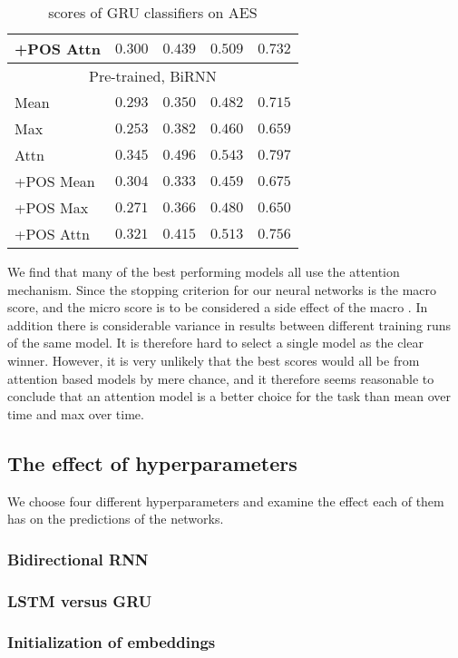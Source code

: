 \begin{table}
\begin{tabular}{lrrrr}
    +POS Attn & $0.300$ & $0.439$ & $0.509$ & $0.732$ \\
    \midrule \multicolumn{5}{c}{Pre-trained, BiRNN} \\ \midrule
    Mean & $0.293$ & $0.350$ & $0.482$ & $0.715$ \\
    Max & $0.253$ & $0.382$ & $0.460$ & $0.659$ \\
    Attn & $0.345$ & $\mathbf{0.496}$ & $0.543$ & $\mathbf{0.797}$ \\
    +POS Mean & $0.304$ & $0.333$ & $0.459$ & $0.675$ \\
    +POS Max & $0.271$ & $0.366$ & $0.480$ & $0.650$ \\
    +POS Attn & $0.321$ & $0.415$ & $0.513$ & $0.756$ \\
    \bottomrule
  \end{tabular}
  \caption{\FI scores of GRU classifiers on AES}
  \label{tab:gru-results}
\end{table}

We find that many of the best performing models all use the attention
mechanism. Since the stopping criterion for our neural networks is the macro
\FI score, and the micro \FI score is to be considered a side effect of the
macro \FI. In addition there is considerable variance in results between
different training runs of the same model. It is therefore hard to select a
single model as the clear winner. However, it is very unlikely that the best
scores would all be from attention based models by mere chance, and it
therefore seems reasonable to conclude that an attention model is a better
choice for the task than mean over time and max over time.


\subsection{The effect of hyperparameters}

We choose four different hyperparameters and examine the effect each of them
has on the predictions of the networks.


\subsubsection*{Bidirectional RNN}


\subsubsection*{LSTM versus GRU}


\subsubsection*{Initialization of embeddings}


